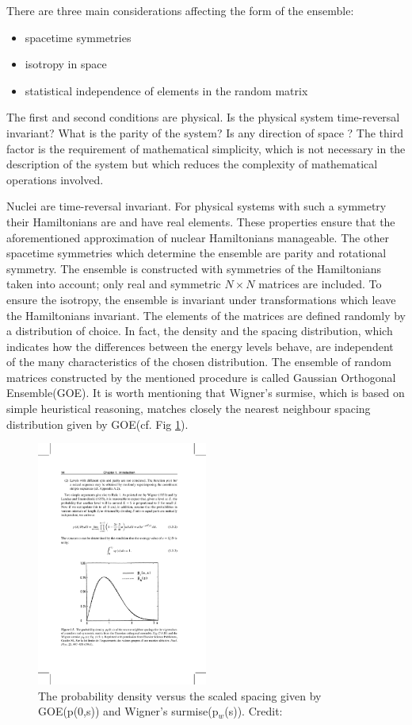 There are three main considerations affecting the form of the ensemble\cite{mezz}:
\begin{itemize}
\item spacetime symmetries
\item isotropy in space
\item statistical independence of elements in the random matrix
\end{itemize}
The first and second conditions are physical. Is the physical system time-reversal invariant? What is the parity of the system? Is any direction of space ? The third factor is the requirement of mathematical simplicity, which is not necessary in the description of the system but which reduces the complexity of mathematical operations involved. 

Nuclei are time-reversal invariant.\cite{rmc7}  For physical systems with such a symmetry their Hamiltonians are  and have real elements. These properties ensure that the aforementioned approximation of nuclear Hamiltonians  manageable. The other spacetime symmetries which determine the ensemble are parity and rotational symmetry. The ensemble is constructed with symmetries of the Hamiltonians taken into account; only real and symmetric $N\times N$ matrices are included. To ensure the isotropy, the ensemble is invariant under transformations which leave the Hamiltonians invariant. The elements of the matrices are defined randomly by a distribution of choice. In fact, the density and the spacing distribution, which indicates how the differences between the energy levels behave, are independent of the many characteristics of the chosen distribution.\cite{rmc7} The ensemble of random matrices constructed by the mentioned procedure is called Gaussian Orthogonal Ensemble(GOE). It is worth mentioning that Wigner's surmise, which is based on simple heuristical reasoning, matches closely the nearest neighbour spacing distribution given by GOE(cf. Fig \ref{fig:2}). 

\begin{figure}[H]
\includegraphics[width=0.5\textwidth]{2}
\centering
\caption{The probability density versus the scaled spacing given by GOE(p(0,s)) and Wigner's surmise(p$_w$(s)). Credit:\cite{ga61}}
\label{fig:2}
\end{figure}

